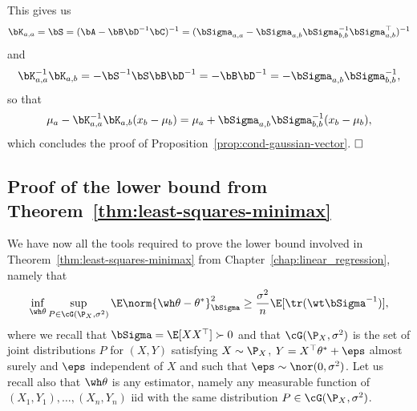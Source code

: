 This gives us
\begin{equation*}
	\bK_{a, a} = \bS = (\bA - \bB \bD^{-1} \bC)^{-1} = (\bSigma_{a,a} - \bSigma_{a,b} \bSigma_{b,b}^{-1} \bSigma_{a,b}^\top)^{-1}
\end{equation*}
and
\begin{equation*}
	\bK_{a,a}^{-1} \bK_{a,b} = - \bS^{-1} \bS \bB \bD^{-1} = - \bB \bD^{-1} = - \bSigma_{a,b} \bSigma_{b,b}^{-1},
\end{equation*}
so that
\begin{align*}
	\mu_a - \bK_{a, a}^{-1} \bK_{a, b} (x_b - \mu_b) = \mu_a + \bSigma_{a,b} \bSigma_{b,b}^{-1} (x_b - \mu_b),
\end{align*}
which concludes the proof of Proposition~\ref{prop:cond-gaussian-vector}. $\hfill \square$



\subsection{Proof of the lower bound from Theorem~\ref{thm:least-squares-minimax}}
\label{sec:proof_of_the_minimax_lower_bound_}

We have now all the tools required to prove the lower bound involved in Theorem~\ref{thm:least-squares-minimax} from Chapter~\ref{chap:linear_regression}, namely that
\begin{equation}
	\inf_{\wh \theta} \sup_{P \in \cG(\P_X, \sigma^2)} \E \norm{\wh \theta - \theta^*}_{\bSigma}^2 
	\geq \frac{\sigma^2}{n} \E [\tr({\wt \bSigma}^{-1})],
\end{equation}
where we recall that  $\bSigma = \E[X X^\top] \succ 0$ and that $\cG(\P_X, \sigma^2)$ is the set of joint distributions $P$ for $(X, Y)$ satisfying $X \sim \P_X$, $Y = X^\top \theta^* + \eps$ almost surely and $\eps$ independent of $X$ and such that $\eps \sim \nor(0, \sigma^2)$.
Let us recall also that $\wh \theta$ is any estimator, namely any measurable function of $(X_1, Y_1), \ldots, (X_n, Y_n)$ iid with the same distribution $P \in \cG(\P_X, \sigma^2)$.

